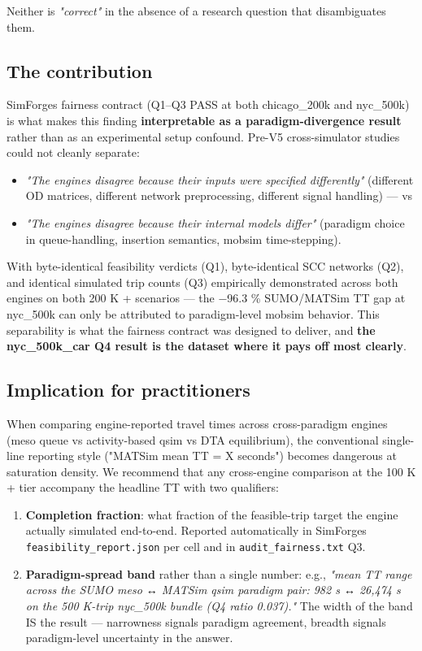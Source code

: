 Neither is \emph{"correct"} in the absence of a research question that
disambiguates them.

\subsection{The contribution}\label{the-contribution}

SimForge\textquotesingle s fairness contract (Q1--Q3 PASS at both
chicago\_200k and nyc\_500k) is what makes this finding
\textbf{interpretable as a paradigm-divergence result} rather than as an
experimental setup confound. Pre-V5 cross-simulator studies could not
cleanly separate:

\begin{itemize}
\tightlist
\item
  \emph{"The engines disagree because their inputs were specified
  differently"} (different OD matrices, different network preprocessing,
  different signal handling) --- vs
\item
  \emph{"The engines disagree because their internal models differ"}
  (paradigm choice in queue-handling, insertion semantics, mobsim
  time-stepping).
\end{itemize}

With byte-identical feasibility verdicts (Q1), byte-identical SCC
networks (Q2), and identical simulated trip counts (Q3) empirically
demonstrated across both engines on both 200 K + scenarios --- the −96.3
\% SUMO/MATSim TT gap at nyc\_500k can only be attributed to
paradigm-level mobsim behavior. This separability is what the fairness
contract was designed to deliver, and \textbf{the nyc\_500k\_car Q4
result is the dataset where it pays off most clearly}.

\subsection{Implication for
practitioners}\label{implication-for-practitioners}

When comparing engine-reported travel times across cross-paradigm
engines (meso queue vs activity-based qsim vs DTA equilibrium), the
conventional single-line reporting style ("MATSim mean TT = X seconds")
becomes dangerous at saturation density. We recommend that any
cross-engine comparison at the 100 K + tier accompany the headline TT
with two qualifiers:

\begin{enumerate}
\def\labelenumi{\arabic{enumi}.}
\tightlist
\item
  \textbf{Completion fraction}: what fraction of the feasible-trip
  target the engine actually simulated end-to-end. Reported
  automatically in SimForge\textquotesingle s
  \texttt{feasibility\_report.json} per cell and in
  \texttt{audit\_fairness.txt} Q3.
\item
  \textbf{Paradigm-spread band} rather than a single number: e.g.,
  \emph{"mean TT range across the SUMO meso ↔ MATSim qsim paradigm pair:
  982 s ↔ 26,474 s on the 500 K-trip nyc\_500k bundle (Q4 ratio
  0.037)."} The width of the band IS the result --- narrowness signals
  paradigm agreement, breadth signals paradigm-level uncertainty in the
  answer.
\end{enumerate}

